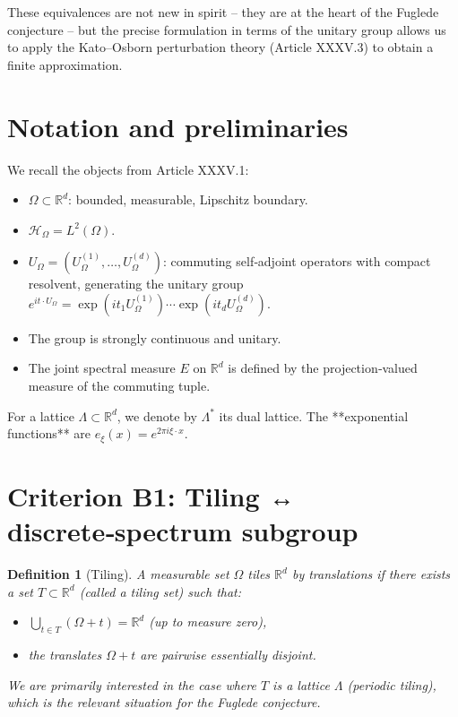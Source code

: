 \documentclass[11pt,a4paper]{article}
\newtheorem{definition}[theorem]{Definition}
\begin{document}
These equivalences are not new in spirit – they are at the heart of the Fuglede conjecture – but the precise formulation in terms of the unitary group allows us to apply the Kato–Osborn perturbation theory (Article XXXV.3) to obtain a finite approximation.

\section{Notation and preliminaries}

We recall the objects from Article XXXV.1:
\begin{itemize}
\item $\Omega \subset \mathbb{R}^d$: bounded, measurable, Lipschitz boundary.
\item $\mathcal{H}_\Omega = L^2(\Omega)$.
\item $U_\Omega = (U_\Omega^{(1)},\dots,U_\Omega^{(d)})$: commuting self‑adjoint operators with compact resolvent, generating the unitary group $e^{i t \cdot U_\Omega} = \exp(i t_1 U_\Omega^{(1)}) \cdots \exp(i t_d U_\Omega^{(d)})$.
\item The group is strongly continuous and unitary.
\item The joint spectral measure $E$ on $\mathbb{R}^d$ is defined by the projection‑valued measure of the commuting tuple.
\end{itemize}

For a lattice $\Lambda \subset \mathbb{R}^d$, we denote by $\Lambda^*$ its dual lattice. The **exponential functions** are $e_\xi(x) = e^{2\pi i \xi \cdot x}$.

\section{Criterion B1: Tiling ↔ discrete‑spectrum subgroup}

\begin{definition}[Tiling]
A measurable set $\Omega$ tiles $\mathbb{R}^d$ by translations if there exists a set $T \subset \mathbb{R}^d$ (called a tiling set) such that:
\begin{itemize}
\item $\bigcup_{t \in T} (\Omega + t) = \mathbb{R}^d$ (up to measure zero),
\item the translates $\Omega + t$ are pairwise essentially disjoint.
\end{itemize}
We are primarily interested in the case where $T$ is a lattice $\Lambda$ (periodic tiling), which is the relevant situation for the Fuglede conjecture.
\end{definition}
\end{document}
